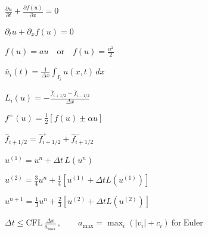 \documentclass{article}
\begin{document}
\begin{preview}
\hbox{
\color[HTML]{FFFFFF}
\fontsize{25}{30.00}\selectfont
$\displaystyle \frac{\partial u}{\partial t}+\frac{\partial f(u)}{\partial x}=0$
}
\end{preview}
\begin{preview}
\hbox{
\color[HTML]{242424}
\fontsize{29}{34.80}\selectfont
$\displaystyle \partial_t u+\partial_x f(u)=0$
}
\end{preview}
\begin{preview}
\hbox{
\color[HTML]{242424}
\fontsize{23}{27.60}\selectfont
$\displaystyle f(u)=a u\quad\mathrm{or}\quad f(u)=\frac{u^2}{2}$
}
\end{preview}
\begin{preview}
\hbox{
\color[HTML]{242424}
\fontsize{24}{28.80}\selectfont
$\displaystyle \bar u_i(t)=\frac{1}{\Delta x}\int_{I_i}u(x,t)\,dx$
}
\end{preview}
\begin{preview}
\hbox{
\color[HTML]{242424}
\fontsize{24}{28.80}\selectfont
$\displaystyle L_i(u)=-\frac{\hat f_{i+1/2}-\hat f_{i-1/2}}{\Delta x}$
}
\end{preview}
\begin{preview}
\hbox{
\color[HTML]{242424}
\fontsize{24}{28.80}\selectfont
$\displaystyle f^{\pm}(u)=\frac{1}{2}\left[f(u)\pm\alpha u\right]$
}
\end{preview}
\begin{preview}
\hbox{
\color[HTML]{242424}
\fontsize{23}{27.60}\selectfont
$\displaystyle \hat f_{i+1/2}=\hat f^{+}_{i+1/2}+\hat f^{-}_{i+1/2}$
}
\end{preview}
\begin{preview}
\hbox{
\color[HTML]{242424}
\fontsize{24}{28.80}\selectfont
$\displaystyle u^{(1)}=u^n+\Delta t\,L(u^n)$
}
\end{preview}
\begin{preview}
\hbox{
\color[HTML]{242424}
\fontsize{22}{26.40}\selectfont
$\displaystyle u^{(2)}=\frac{3}{4}u^n+\frac{1}{4}\left[u^{(1)}+\Delta t L(u^{(1)})\right]$
}
\end{preview}
\begin{preview}
\hbox{
\color[HTML]{242424}
\fontsize{22}{26.40}\selectfont
$\displaystyle u^{n+1}=\frac{1}{3}u^n+\frac{2}{3}\left[u^{(2)}+\Delta t L(u^{(2)})\right]$
}
\end{preview}
\begin{preview}
\hbox{
\color[HTML]{242424}
\fontsize{21}{25.20}\selectfont
$\displaystyle \Delta t\leq\mathrm{CFL}\,\frac{\Delta x}{a_{\max}}\,,\qquad a_{\max}=\max_i(|v_i|+c_i)\ \mathrm{for\ Euler}$
}
\end{preview}
\end{document}
